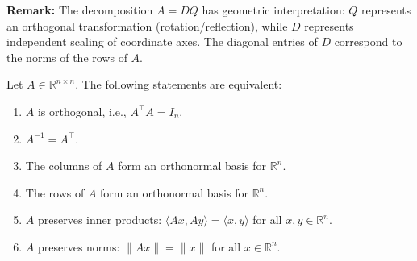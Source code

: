 \textbf{Remark:} The decomposition \(A = D Q\) has geometric interpretation: \(Q\) represents an orthogonal transformation (rotation/reflection), while \(D\) represents independent scaling of coordinate axes. The diagonal entries of \(D\) correspond to the norms of the rows of \(A\).


\begin{theorem}
Let $A \in \mathbb{R}^{n \times n}$. The following statements are equivalent:
\begin{enumerate}
    \item $A$ is orthogonal, i.e., $A^\top A = I_n$.
    \item $A^{-1} = A^\top$.
    \item The columns of $A$ form an orthonormal basis for $\mathbb{R}^n$.
    \item The rows of $A$ form an orthonormal basis for $\mathbb{R}^n$.
    \item $A$ preserves inner products: $\langle Ax, Ay \rangle = \langle x, y \rangle$ for all $x, y \in \mathbb{R}^n$.
    \item $A$ preserves norms: $\|Ax\| = \|x\|$ for all $x \in \mathbb{R}^n$.
\end{enumerate}
\end{theorem}

